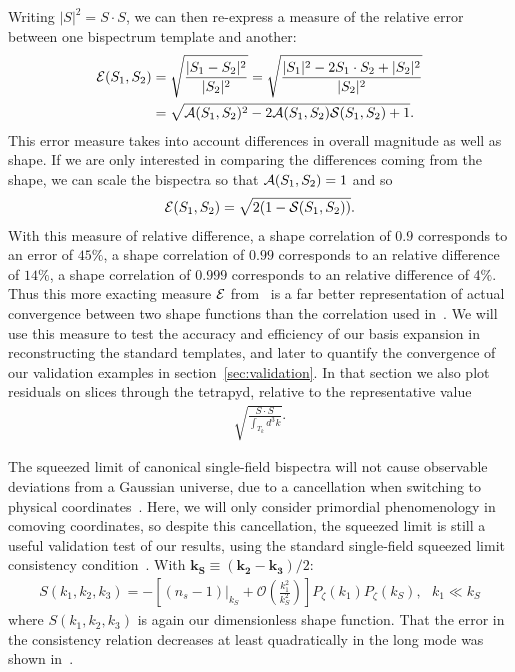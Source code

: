 Writing $|S|^2=S\cdot S$,
we can then re-express a measure of the relative error
between one bispectrum template and another:
\begin{align}\label{relative_difference}
\mathcal{E}(S_1,S_2) &= \sqrt{\frac{|S_1-S_2|^2}{|S_2|^2}}  = \sqrt{\frac{|S_1|^2-2S_1\cdot S_2+|S_2|^2}{|S_2|^2}}\nonumber\\
	   &= \sqrt{\mathcal{A}(S_1,S_2)^2-2\mathcal{A}(S_1,S_2)\mathcal{S}(S_1,S_2)+1}.
\end{align}
This error measure takes into account differences in overall magnitude as well as shape.
If we are only interested in comparing the differences coming from the shape,
we can scale the bispectra so that $\mathcal{A}(S_1,S_2)=1$ and so
\begin{align}\label{relative_difference_scaled}
    \mathcal{E}(S_1,S_2) = \sqrt{2(1-\mathcal{S}(S_1,S_2))}.
\end{align}
With this measure of relative difference, a shape correlation of $0.9$ corresponds to an error of $45\%$,
a shape correlation of $0.99$ corresponds to an relative difference of $14\%$,
a shape correlation of $0.999$ corresponds to an relative difference of $4\%$.
Thus this more exacting measure $\mathcal{E}$ from~\cite{hung_1902} is a far better representation of actual convergence  between two shape functions
than the correlation used in~\cite{Funakoshi}.
We will use this measure to test the accuracy and efficiency of our basis expansion
in reconstructing the standard templates, and later to quantify the convergence
of our validation examples in section~\ref{sec:validation}.
In that section we also plot residuals on slices through the tetrapyd,
relative to the representative value
\begin{align}\label{rep_val}
    \sqrt{\frac{S\cdot S}{\int_{T_k} d^3k}}.
\end{align}

The squeezed limit of canonical single-field bispectra will not cause
observable deviations from a Gaussian universe,
due to a cancellation when switching to physical coordinates~\cite{Cabass_2016}.
Here, we will only consider primordial phenomenology
in comoving coordinates, so despite this cancellation,
the squeezed limit is still a useful validation test of our results,
using the standard single-field squeezed limit consistency condition~\cite{sqz_consistency,not_so_sqz}.
With $\mathbf{k_S}\equiv\left(\mathbf{k_2}-\mathbf{k_3}\right)/2 $:
\begin{align}\label{eq:sqz_consistency}
    S(k_1,k_2,k_3) = -\left[(n_s-1)|_{k_S}+\mathcal{O}\left(\frac{k_1^2}{k_S^2}\right)\right]P_{\zeta}(k_1)P_{\zeta}(k_S),
\ \ \  k_1\ll k_S
\end{align}
where $S(k_1,k_2,k_3)$ is again our dimensionless shape function.
That the error in the consistency relation decreases at least quadratically
in the long mode was shown in~\cite{not_so_sqz}.

